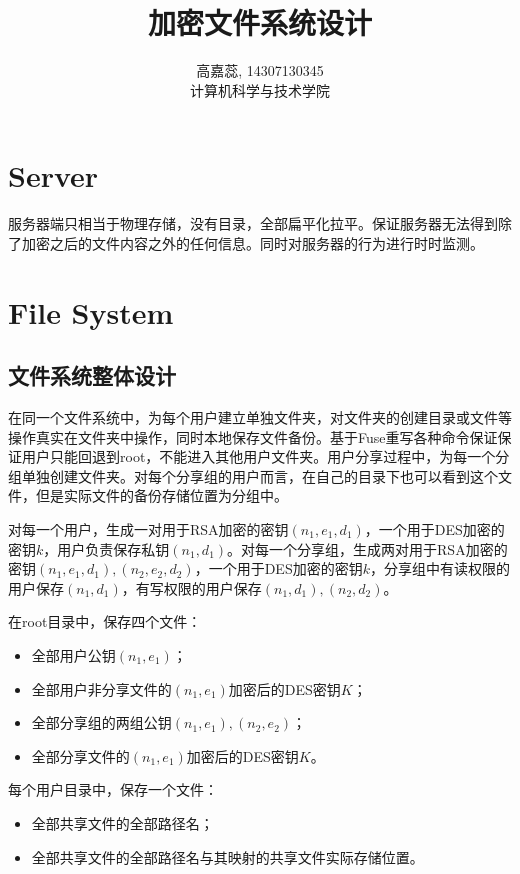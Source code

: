 \documentclass[11pt, oneside]{ctexart}
\begin{document}
\title{加密文件系统设计}
\author{高嘉蕊, 14307130345 \\ 计算机科学与技术学院}
\maketitle

\section{Server}
服务器端只相当于物理存储，没有目录，全部扁平化拉平。保证服务器无法得到除了加密之后的文件内容之外的任何信息。同时对服务器的行为进行时时监测。


\section{File System}
\subsection{文件系统整体设计}
在同一个文件系统中，为每个用户建立单独文件夹，对文件夹的创建目录或文件等操作真实在文件夹中操作，同时本地保存文件备份。基于Fuse重写各种命令保证保证用户只能回退到root，不能进入其他用户文件夹。用户分享过程中，为每一个分组单独创建文件夹。对每个分享组的用户而言，在自己的目录下也可以看到这个文件，但是实际文件的备份存储位置为分组中。

对每一个用户，生成一对用于RSA加密的密钥$(n_1, e_1, d_1)$，一个用于DES加密的密钥$k$，用户负责保存私钥$(n_1, d_1)$。对每一个分享组，生成两对用于RSA加密的密钥$(n_1, e_1, d_1), (n_2, e_2, d_2)$，一个用于DES加密的密钥$k$，分享组中有读权限的用户保存$(n_1, d_1)$，有写权限的用户保存$(n_1, d_1), (n_2, d_2)$。

在root目录中，保存四个文件：
\begin{itemize}
\item 全部用户公钥$(n_1, e_1)$；
\item 全部用户非分享文件的$(n_1, e_1)$加密后的DES密钥$K$；
\item 全部分享组的两组公钥$(n_1, e_1), (n_2, e_2)$；
\item 全部分享文件的$(n_1, e_1)$加密后的DES密钥$K$。
\end{itemize}

每个用户目录中，保存一个文件：
\begin{itemize}
\item 全部共享文件的全部路径名；
\item 全部共享文件的全部路径名与其映射的共享文件实际存储位置。
\end{itemize}
\end{document}

